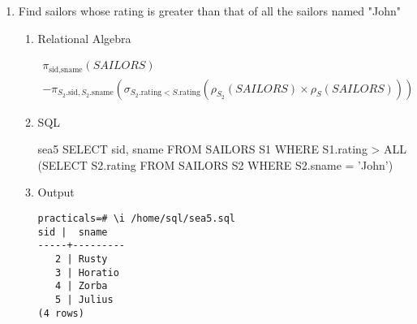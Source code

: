\begin{enumerate}
\begin{enumerate}
		            \begin{equation*}
			            \pi_{\text{sid}} - \pi_{\text{sid}}(SAILORS \bowtie \sigma_{\text{date\_of\_birth}\; >\; \text{Jan 2018}}(RESERVES))
		            \end{equation*}

		      \item SQL

		            \begin{sqlQuery}{sea4}
                    SELECT sid FROM SAILORS 
                    WHERE sid NOT IN 
                        (SELECT sid FROM RESERVES 
                        WHERE date_of_birth > '2018-01-01')
                    \end{sqlQuery}

		      \item Output
		            \begin{lstlisting}[style=output]
practicals=# \i /home/sql/sea4.sql
sid
-----
3
4
5
(3 rows)
                        \end{lstlisting}

	      \end{enumerate}

	\item  Find sailors whose rating is greater than that of all the sailors named "John"
	      \begin{enumerate}
		      \item Relational Algebra

		            \begin{multline*}
			            \pi_{\text{sid}, \text{sname}}(SAILORS) \\
			            - \pi_{S_2.\text{sid},S_2.\text{sname}}(\sigma_{S_2.\text{rating} < S.\text{rating}}(\rho_{S_2}(SAILORS)\times \rho_S(SAILORS)))
		            \end{multline*}
		            \pagebreak

		      \item SQL

		            \begin{sqlQuery}{sea5}
                        SELECT sid, sname FROM SAILORS S1
                        WHERE S1.rating > ALL
                                (SELECT S2.rating FROM SAILORS S2
                                WHERE S2.sname = 'John')
                    \end{sqlQuery}

		      \item Output
		            \begin{lstlisting}[style=output]
practicals=# \i /home/sql/sea5.sql
sid |  sname  
-----+---------
   2 | Rusty
   3 | Horatio
   4 | Zorba
   5 | Julius
(4 rows)
                        \end{lstlisting}


\end{enumerate}
\end{enumerate}
